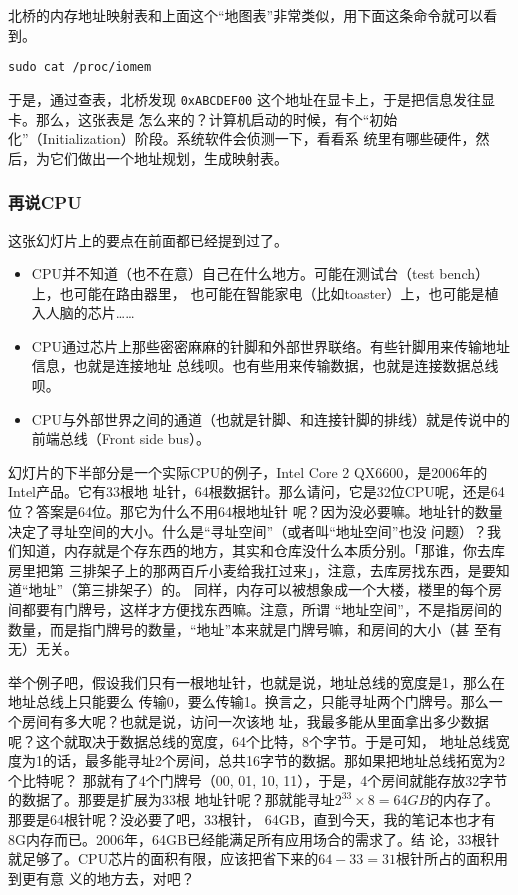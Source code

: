 \documentclass{wx672ctexart}
\newcommand\mpic[1]{%
  \marginpar{\texttt{[image: thumbnails/\#1]}}}
\begin{document}
北桥的内存地址映射表和上面这个“地图表”非常类似，用下面这条命令就可以看到。
\begin{verbatim}
sudo cat /proc/iomem
\end{verbatim}

于是，通过查表，北桥发现 \texttt{0xABCDEF00} 这个地址在显卡上，于是把信息发往显卡。那么，这张表是
怎么来的？计算机启动的时候，有个“初始化”（Initialization）阶段。系统软件会侦测一下，看看系
统里有哪些硬件，然后，为它们做出一个地址规划，生成映射表。

\subsubsection{再说CPU}
\label{sec:orgfe4ee57}

这张幻灯片上的要点在前面都已经提到过了。\mpic{pg_0025}
\begin{itemize}
\item CPU并不知道（也不在意）自己在什么地方。可能在测试台（test bench）上，也可能在路由器里，
也可能在智能家电（比如toaster）上，也可能是植入人脑的芯片……
\item CPU通过芯片上那些密密麻麻的针脚和外部世界联络。有些针脚用来传输地址信息，也就是连接地址
总线呗。也有些用来传输数据，也就是连接数据总线呗。
\item CPU与外部世界之间的通道（也就是针脚、和连接针脚的排线）就是传说中的前端总线（Front side
bus）。
\end{itemize}

幻灯片的下半部分是一个实际CPU的例子，Intel Core 2 QX6600，是2006年的Intel产品。它有33根地
址针，64根数据针。那么请问，它是32位CPU呢，还是64位？答案是64位。那它为什么不用64根地址针
呢？因为没必要嘛。地址针的数量决定了寻址空间的大小。什么是“寻址空间”（或者叫“地址空间”也没
问题）？我们知道，内存就是个存东西的地方，其实和仓库没什么本质分别。「那谁，你去库房里把第
三排架子上的那两百斤小麦给我扛过来」，注意，去库房找东西，是要知道“地址”（第三排架子）的。
同样，内存可以被想象成一个大楼，楼里的每个房间都要有门牌号，这样才方便找东西嘛。注意，所谓
“地址空间”，不是指房间的数量，而是指门牌号的数量，“地址”本来就是门牌号嘛，和房间的大小（甚
至有无）无关。

举个例子吧，假设我们只有一根地址针，也就是说，地址总线的宽度是1，那么在地址总线上只能要么
传输0，要么传输1。换言之，只能寻址两个门牌号。那么一个房间有多大呢？也就是说，访问一次该地
址，我最多能从里面拿出多少数据呢？这个就取决于数据总线的宽度，64个比特，8个字节。于是可知，
地址总线宽度为1的话，最多能寻址2个房间，总共16字节的数据。那如果把地址总线拓宽为2个比特呢？
那就有了4个门牌号（00, 01, 10, 11），于是，4个房间就能存放32字节的数据了。那要是扩展为33根
地址针呢？那就能寻址\(2^{33} \times 8 = 64GB\)的内存了。那要是64根针呢？没必要了吧，33根针，
64GB，直到今天，我的笔记本也才有8G内存而已。2006年，64GB已经能满足所有应用场合的需求了。结
论，33根针就足够了。CPU芯片的面积有限，应该把省下来的\(64-33=31\)根针所占的面积用到更有意
义的地方去，对吧？
\end{document}
